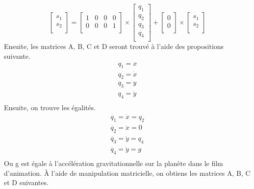 \documentclass{article}
\begin{document}
\begin{equation}
  	\begin{bmatrix}
 	s_{1} \\ 
  	s_{2} \\
  	\end{bmatrix}
  	=
  	\begin{bmatrix}
  	1 & 0 & 0 & 0 \\ 
  	0 & 0 & 0 & 1 \\
  	\end{bmatrix}
 	\times
  	\begin{bmatrix}
  	q_{1} \\ 
  	q_{2} \\ 
  	q_{3} \\ 
 	q_{4} \\
  	\end{bmatrix}
  	+
  	\begin{bmatrix}
  	0 \\ 
  	0 \\
  	\end{bmatrix}
  	\times
  	\begin{bmatrix}
  	s_{1} \\ 
  	s_{2} \\
  	\end{bmatrix}
\end{equation}
Ensuite, les matrices A, B, C et D seront trouvé à l'aide des propositions suivante.
\begin{equation}
\begin{matrix}
q_{1} = x \\ 
q_{2} = \dot{x} \\
q_{3} = y \\
q_{4} = \dot{y} \\
\end{matrix}
\end{equation}
Ensuite, on trouve les égalités.
\begin{equation}
\begin{matrix}
\dot{q_{1}} = \dot{x} = q_{2} \\ 
\dot{q_{2}} = \ddot{x} = 0 \\
\dot{q_{3}} = \dot{y} = q_{4} \\ 
\dot{q_{4}} = \ddot{y} = g \\
\end{matrix}
\end{equation}
\newpage
\noindent
Ou g est égale à l'accélération gravitationnelle sur la planète dans le film d'animation. À l'aide de manipulation matricielle, on obtiens les matrices A, B, C et D suivantes.
\end{document}
